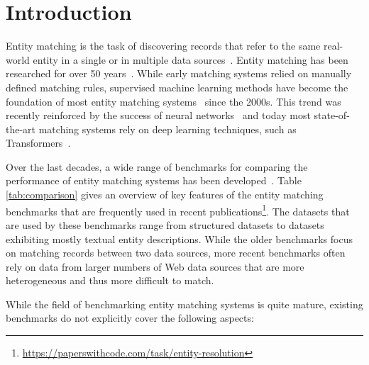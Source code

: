 \documentclass[sigconf,edbt]{acmart-edbt2024}
\begin{document}
\maketitle

\section{Introduction}
\label{sec:introduction}

Entity matching is the task of discovering records that refer to the same real-world entity in a single or in multiple data sources~\cite{Christen2012DataMC,christophides_end--end_2020}. Entity matching has been researched for over 50 years~\cite{fellegiTheoryRecordLinkage1969}. While early matching systems relied on manually defined matching rules, supervised machine learning methods have become the foundation of most entity matching systems~\cite{christophides_end--end_2020} since the 2000s. This trend was recently reinforced by the success of neural networks~\cite{BarlaugNeural2021} and today most state-of-the-art matching systems rely on deep learning techniques, such as Transformers~\cite{vaswaniAttentionAllYou2017,devlinBERTPretrainingDeep2019,brunnerEntityMatchingTransformer2020,liDeepEntityMatching2020}. 

Over the last decades, a wide range of benchmarks for comparing the performance of entity matching systems has been developed~\cite{primpeliProfilingEntityMatching2020}. Table \ref{tab:comparison} gives an overview of key features of the entity matching benchmarks that are frequently used in recent publications\footnote{\url{https://paperswithcode.com/task/entity-resolution}}. The datasets that are used by these benchmarks range from structured datasets to datasets exhibiting mostly textual entity descriptions. While the older benchmarks focus on matching records between two data sources, more recent benchmarks often rely on data from larger numbers of Web data sources that are more heterogeneous and thus more difficult to match.

While the field of benchmarking entity matching systems is quite mature, existing benchmarks do not explicitly cover the following aspects:
\end{document}
